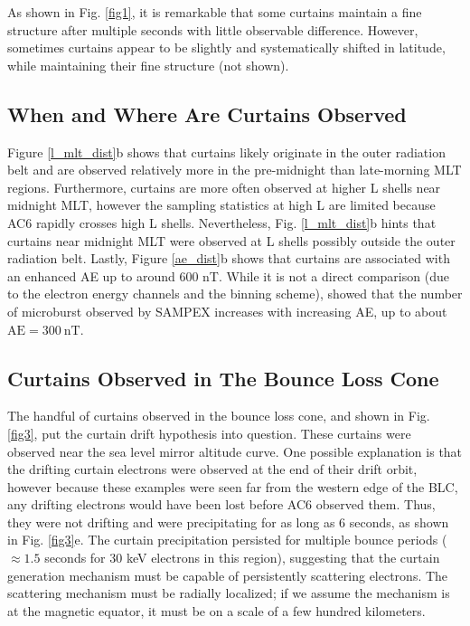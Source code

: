 \documentclass[draft]{agujournal2019}
\begin{document}
As shown in Fig. \ref{fig1}, it is remarkable that some curtains maintain a fine structure after multiple seconds with little observable difference. However, sometimes curtains appear to be slightly and systematically shifted in latitude, while maintaining their fine structure (not shown).

\subsection{When and Where Are Curtains Observed}
Figure \ref{l_mlt_dist}b shows that curtains likely originate in the outer radiation belt and are observed relatively more in the pre-midnight than late-morning MLT regions. Furthermore, curtains are more often observed at higher L shells near midnight MLT, however the sampling statistics at high L are limited because AC6 rapidly crosses high L shells. Nevertheless, Fig. \ref{l_mlt_dist}b hints that curtains near midnight MLT were observed at L shells possibly outside the outer radiation belt. Lastly, Figure \ref{ae_dist}b shows that curtains are associated with an enhanced AE up to around 600 nT. While it is not a direct comparison (due to the electron energy channels and the binning scheme),  showed that the number of microburst observed by SAMPEX increases with increasing AE, up to about $\mathrm{AE} = 300 \ \mathrm{nT}$.
 
\subsection{Curtains Observed in The Bounce Loss Cone}
The handful of curtains observed in the bounce loss cone, and shown in Fig. \ref{fig3}, put the  curtain drift hypothesis into question. These curtains were observed near the sea level mirror altitude curve. One possible explanation is that the drifting curtain electrons were observed at the end of their drift orbit, however because these examples were seen far from the western edge of the BLC, any drifting electrons would have been lost before AC6 observed them. Thus, they were not drifting and were precipitating for as long as 6 seconds, as shown in Fig. \ref{fig3}e. The curtain precipitation persisted for multiple bounce periods ($\approx 1.5$ seconds for 30 keV electrons in this region), suggesting that the curtain generation mechanism must be capable of persistently scattering electrons. The scattering mechanism must be radially localized; if we assume the mechanism is at the magnetic equator, it must be on a scale of a few hundred kilometers. 
\end{document}
